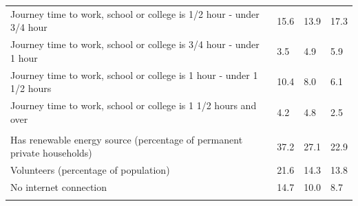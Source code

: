 \documentclass{article}
\begin{document}
\begin{table}[h]
\begin{tabular}{KTTT}
Journey time to work, school or college is 1/2 hour - under 3/4 hour & 15.6& 13.9& 17.3\\
Journey time to work, school or college is 3/4 hour - under 1 hour & 3.5& 4.9& 5.9\\
Journey time to work, school or college is 1 hour - under 1 1/2 hours & 10.4&  8.0&  6.1\\
Journey time to work, school or college is 1 1/2 hours and over & 4.2& 4.8& 2.5\\
\hline
    \\ 
    \hline
Has renewable energy source (percentage of permanent private households) & 37.2& 27.1& 22.9\\
    \hline
Volunteers (percentage of population) & 21.6& 14.3& 13.8\\
    \hline
No internet connection& 14.7& 10.0&  8.7\\
\hline
\end{tabular}
\end{table}
\end{document}
